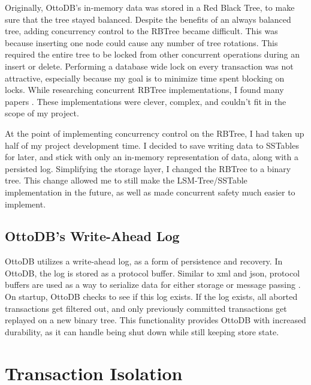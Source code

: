\documentclass[conference]{IEEEtran}
\begin{document}
    Originally, OttoDB’s in-memory data was stored in a Red Black Tree, to make sure that the tree stayed balanced. Despite the benefits of an always balanced tree, adding concurrency control to the RBTree became difficult. This was because inserting one node could cause any number of tree rotations. This required the entire tree to be locked from other concurrent operations during an insert or delete. Performing a database wide lock on every transaction was not attractive, especially because my goal is to minimize time spent blocking on locks. While researching concurrent RBTree implementations, I found many papers \cite{b20, b21}. These implementations were clever, complex, and couldn’t fit in the scope of my project.


    At the point of implementing concurrency control on the RBTree, I had taken up half of my project development time. I decided to save writing data to SSTables for later, and stick with only an in-memory representation of data, along with a persisted log. Simplifying the storage layer, I changed the RBTree to a  binary tree. This change allowed me to still make the LSM-Tree/SSTable implementation in the future, as well as made concurrent safety much easier to implement.


    \subsection{OttoDB’s Write-Ahead Log}


    OttoDB utilizes a write-ahead log, as a form of persistence and recovery. In OttoDB, the log is stored as a protocol buffer. Similar to xml and json, protocol buffers are used as a way to serialize data for either storage or message passing \cite{b22}. On startup, OttoDB checks to see if this log exists. If the log exists, all aborted transactions get filtered out, and only previously committed transactions get replayed on a new binary tree. This functionality provides OttoDB with increased durability, as it can handle being shut down while still keeping store state.

    \section{Transaction Isolation}
\end{document}
